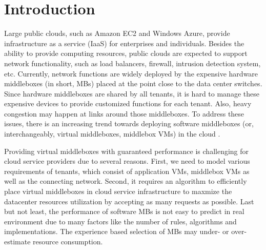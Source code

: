 \documentclass[review]{elsarticle}
\begin{document}
\section{Introduction}
Large public clouds, such as Amazon EC2 and Windows Azure, provide infrastructure as a service (IaaS) for enterprises and individuals. Besides the ability to provide computing resources, public clouds are expected to support network functionality, such as load balancers, firewall, intrusion detection system, etc. Currently, network functions are widely deployed by the expensive hardware middleboxes (in short, MBs) placed at the point close to the data center switches. %
Since hardware middleboxes are shared by all tenants, it is hard to manage these expensive devices to provide customized functions for each tenant. Also, heavy congestion may happen at links around those middleboxes. To address these issues, there is an increasing trend towards deploying 
 software middleboxes (or, interchangeably, virtual middleboxes, middlebox VMs) in the cloud \cite{G13dio, stratos12}. %


Providing virtual middleboxes with guaranteed performance is challenging for cloud service providers due to several reasons. First, we need to model various requirements of tenants, which consist of application VMs, middlebox VMs as well as the connecting network. Second, it requires an algorithm to efficiently place virtual middleboxes in cloud service infrastructure to maxmize the datacenter resources utilization by accepting as many requests as possible. Last but not least, the performance of software MBs is not easy to predict in real environment due to many factors like the number of rules, algorithms and implementations. The experience based selection of MBs may under- or over-estimate resource consumption.  
\end{document}
